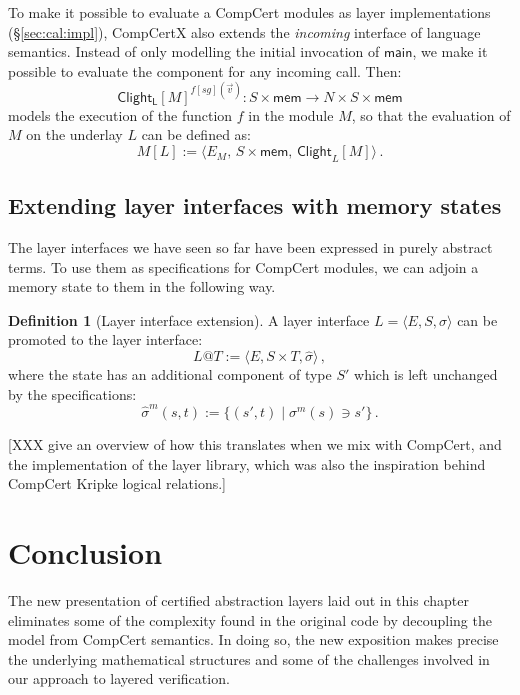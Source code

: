\documentclass[11pt,oneside,draft]{book}
\theoremstyle{definition}
\newtheorem{definition}[theorem]{Definition}
\newcommand{\kw}[1]{\ensuremath{ \mathsf{#1} }}
\begin{document}
To make it possible to evaluate a CompCert modules
as layer implementations (\S\ref{sec:cal:impl}),
CompCertX also extends the \emph{incoming} interface
of language semantics.
Instead of only modelling the initial
invocation of $\kw{main}$,
we make it possible to evaluate the component
for any incoming call.
Then:
\[
  \kw{Clight_L}[M]^{f[\mathit{sg}](\vec{v})} :
    S \times \kw{mem} \rightarrow N \times S \times \kw{mem}
\]
models the execution of the function $f$
in the module $M$,
so that the evaluation of $M$ on the underlay $L$
can be defined as:
\[
  M[L] :=
    \langle
      E_M, \,
      S \times \kw{mem}, \,
      \kw{Clight}_L[M]
    \rangle
  \,.
\]

\subsection{Extending layer interfaces with memory states}

The layer interfaces we have seen so far
have been expressed in purely abstract terms.
To use them as specifications for CompCert modules,
we can adjoin a memory state to them in the following way.

\begin{definition}[Layer interface extension]
A layer interface $L = \langle E, S, \sigma \rangle$
can be promoted to the layer interface:
\[
  L@T := \langle E, S \times T, \hat{\sigma} \rangle
  \,,
\]
where the state has an additional component
of type $S'$ which is left unchanged by the specifications:
\[
  \hat{\sigma}^m(s, t) := \{ (s', t) \mid \sigma^m(s) \ni s' \}
  \,.
\]
\end{definition}




[XXX give an overview of how this translates
when we mix with CompCert,
and the implementation of the layer library,
which was also the inspiration behind
CompCert Kripke logical relations.]


\section{Conclusion} %

The new presentation of certified abstraction layers
laid out in this chapter
eliminates some of the complexity found in the original code
by decoupling the model from CompCert semantics.
In doing so,
the new exposition makes precise the underlying mathematical structures
and some of the challenges involved in
our approach to layered verification.
\end{document}
